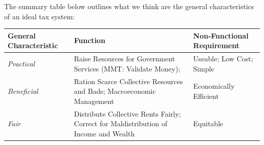 \documentclass[]{tufte-handout}
\begin{document}
The summary table below outlines what we think are the general
characteristics of an ideal tax system:

\begin{longtable}[]{@{}lll@{}}
\toprule
\begin{minipage}[b]{0.30\columnwidth}\raggedright
\textbf{General Characteristic}\strut
\end{minipage} & \begin{minipage}[b]{0.30\columnwidth}\raggedright
\textbf{Function}\strut
\end{minipage} & \begin{minipage}[b]{0.30\columnwidth}\raggedright
\textbf{Non-Functional Requirement}\strut
\end{minipage}\tabularnewline
\midrule
\endhead
\begin{minipage}[t]{0.30\columnwidth}\raggedright
\emph{Practical}\strut
\end{minipage} & \begin{minipage}[t]{0.30\columnwidth}\raggedright
Raise Resources for Government Services (MMT: Validate Money);\strut
\end{minipage} & \begin{minipage}[t]{0.30\columnwidth}\raggedright
Useable; Low Cost; Simple\strut
\end{minipage}\tabularnewline
\begin{minipage}[t]{0.30\columnwidth}\raggedright
\emph{Beneficial}\strut
\end{minipage} & \begin{minipage}[t]{0.30\columnwidth}\raggedright
Ration Scarce Collective Resources and Bads; Macroeconomic
Management\strut
\end{minipage} & \begin{minipage}[t]{0.30\columnwidth}\raggedright
Economically Efficient\strut
\end{minipage}\tabularnewline
\begin{minipage}[t]{0.30\columnwidth}\raggedright
\emph{Fair}\strut
\end{minipage} & \begin{minipage}[t]{0.30\columnwidth}\raggedright
Distribute Collective Rents Fairly; Correct for Maldistribution of
Income and Wealth\strut
\end{minipage} & \begin{minipage}[t]{0.30\columnwidth}\raggedright
Equitable\strut
\end{minipage}\tabularnewline
\bottomrule
\end{longtable}
\end{document}
